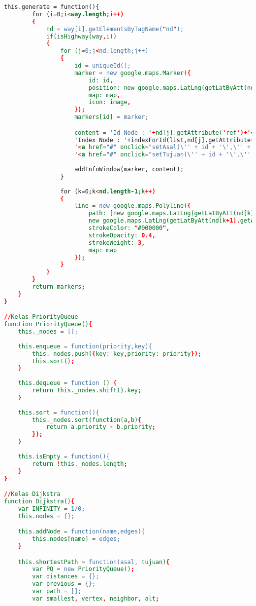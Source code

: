 \begin{lstlisting}[language=HTML,basicstyle=\tiny,caption=aplikasi.html]
	this.generate = function(){
		for (i=0;i<way.length;i++)
		{
			nd = way[i].getElementsByTagName("nd");
			if(isHighway(way,i))
			{
				for (j=0;j<nd.length;j++)
				{
					id = uniqueId();
					marker = new google.maps.Marker({
						id: id,
						position: new google.maps.LatLng(getLatByAtt(nd[j].getAttribute('ref')), getLonByAtt(nd[j].getAttribute('ref'))),
						map: map,
						icon: image,
					});
					markers[id] = marker;

					content = 'Id Node : '+nd[j].getAttribute('ref')+'<br>'+
					'Index Node : '+indexForId(list,nd[j].getAttribute('ref'))+'<br>'+
					'<a href="#" onclick="setAsal(\'' + id + '\',\'' + nd[j].getAttribute('ref') + '\',\'' + indexForId(list,nd[j].getAttribute('ref')) + '\')">Pilih sebagai asal</a>'+'<br>'+
					'<a href="#" onclick="setTujuan(\'' + id + '\',\'' + nd[j].getAttribute('ref') + '\',\'' + indexForId(list,nd[j].getAttribute('ref')) + '\')">Pilih sebagai tujuan</a>';
					
					addInfoWindow(marker, content);	
				}
				
				for (k=0;k<nd.length-1;k++)
				{
					line = new google.maps.Polyline({
						path: [new google.maps.LatLng(getLatByAtt(nd[k].getAttribute('ref')), getLonByAtt(nd[k].getAttribute('ref'))),
						new google.maps.LatLng(getLatByAtt(nd[k+1].getAttribute('ref')), getLonByAtt(nd[k+1].getAttribute('ref')))],
						strokeColor: "#000000",
						strokeOpacity: 0.4,
						strokeWeight: 3,
						map: map
					});
				}
			}
		}
		return markers;
	}
}

//Kelas PriorityQueue
function PriorityQueue(){
	this._nodes = [];
  
	this.enqueue = function(priority,key){
		this._nodes.push({key: key,priority: priority});
		this.sort();
	}
	
	this.dequeue = function () {
		return this._nodes.shift().key;
	}
	
	this.sort = function(){
		this._nodes.sort(function(a,b){
			return a.priority - b.priority;
		});
	}
  
	this.isEmpty = function(){
		return !this._nodes.length;
	}
}

//Kelas Dijkstra
function Dijkstra(){
	var INFINITY = 1/0;
	this.nodes = {};

	this.addNode = function(name,edges){
		this.nodes[name] = edges;
	}

	this.shortestPath = function(asal, tujuan){
		var PQ = new PriorityQueue();
		var	distances = {};
		var	previous = {};
		var	path = [];
		var	smallest, vertex, neighbor, alt;


\end{lstlisting}
